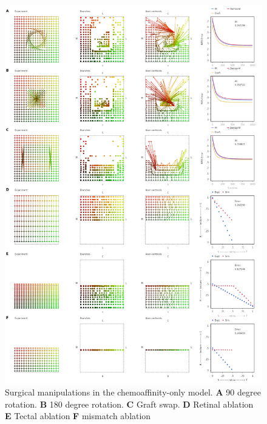 \documentclass[11pt, a4paper]{article}
\begin{document}
%
%
\begin{figure}
\includegraphics[width=0.95\linewidth]{./images/fig_chemo_manipulations.png}
\caption{Surgical manipulations in the chemoaffinity-only model. \textbf{A} 90 degree
rotation. \textbf{B} 180 degree rotation. \textbf{C} Graft swap. \textbf{D}
Retinal ablation \textbf{E} Tectal ablation \textbf{F} mismatch ablation}
\label{f:chsurg}
\end{figure}
\end{document}
